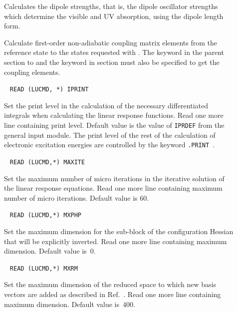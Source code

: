 \begin{description}
\item[] Calculates the dipole strengths,
that is, the dipole oscillator strengths
which determine the visible and UV absorption, using the dipole length form.

\item[] Calculate first-order non-adiabatic coupling
matrix elements
from the reference state to the states requested with .
The keyword  in the parent section to 
and the keyword  in section 
must also be specified to get the coupling elements.


\item[]\verb| |\newline
\verb|READ (LUCMD, *) IPRINT|

Set the print level in the calculation of the necessary differentiated
integrals when calculating the linear response functions. Read one
more line containing print level. Default value is the value of
\verb|IPRDEF| from the general input module. The print level of the
rest of the calculation of electronic excitation energies are
controlled by the keyword \verb|.PRINT |.

\item[]\verb| |\newline
\verb|READ (LUCMD,*) MAXITE|

Set the maximum number of micro iterations in the iterative
solution of the linear response equations. Read
one more line containing maximum number of micro iterations.
Default value is 60.

\item[]\verb| |\newline
\verb|READ (LUCMD,*) MXPHP|

Set the maximum dimension for the sub-block of the configuration
Hessian that will be explicitly inverted. Read one more line
containing maximum dimension. Default value is~0.

\item[]\verb| |\newline
\verb|READ (LUCMD,*) MXRM|

Set the maximum dimension of the reduced space to which new basis
vectors are added as described in Ref.~\cite{tuhjahjajpjjcp84}. Read
one more line containing maximum dimension. Default value is~400.


\end{description}
